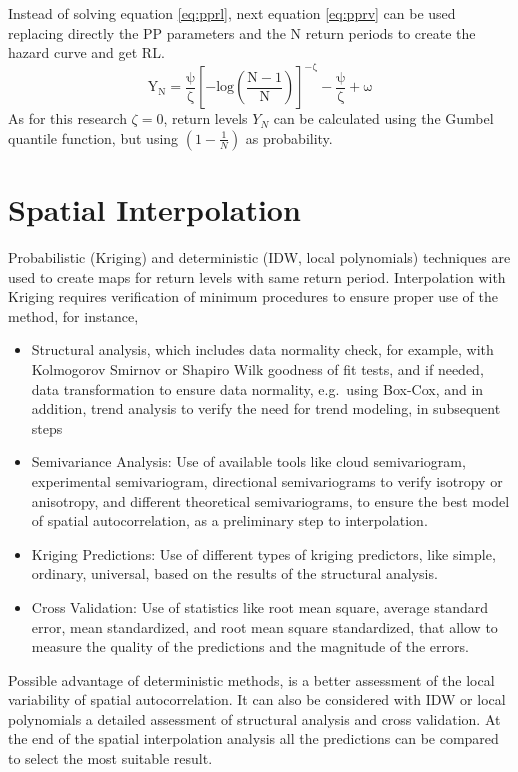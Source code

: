 \documentclass[12pt,oneside]{reedthesis}
\begin{document}
Instead of solving equation \eqref{eq:pprl}, next equation \eqref{eq:pprv} can be used replacing directly the PP parameters and the N return periods to create the hazard curve and get RL.
\begin{equation}
  \mathrm{
Y_N=\frac{\psi}{\zeta}\left[-log\left(\frac{N-1}{N}\right)\right]^{-\zeta}-\frac{\psi}{\zeta}+\omega
        }
  \label{eq:pprv}
\end{equation}
As for this research \(\zeta = 0\), return levels \(Y_N\) can be calculated using the Gumbel quantile function, but using \((1-\frac{1}{N})\) as probability.

\hypertarget{spatial-interpolation}{%
\section{Spatial Interpolation}\label{spatial-interpolation}}

Probabilistic (Kriging) and deterministic (IDW, local polynomials) techniques are used to create maps for return levels with same return period. Interpolation with Kriging requires verification of minimum procedures to ensure proper use of the method, for instance,
\begin{itemize}
\item
  Structural analysis, which includes data normality check, for example, with Kolmogorov Smirnov or Shapiro Wilk goodness of fit tests, and if needed, data transformation to ensure data normality, e.g.~using Box-Cox, and in addition, trend analysis to verify the need for trend modeling, in subsequent steps
\item
  Semivariance Analysis: Use of available tools like cloud semivariogram, experimental semivariogram, directional semivariograms to verify isotropy or anisotropy, and different theoretical semivariograms, to ensure the best model of spatial autocorrelation, as a preliminary step to interpolation.
\item
  Kriging Predictions: Use of different types of kriging predictors, like simple, ordinary, universal, based on the results of the structural analysis.
\item
  Cross Validation: Use of statistics like root mean square, average standard error, mean standardized, and root mean square standardized, that allow to measure the quality of the predictions and the magnitude of the errors.
\end{itemize}
Possible advantage of deterministic methods, is a better assessment of the local variability of spatial autocorrelation. It can also be considered with IDW or local polynomials a detailed assessment of structural analysis and cross validation. At the end of the spatial interpolation analysis all the predictions can be compared to select the most suitable result.
\end{document}

